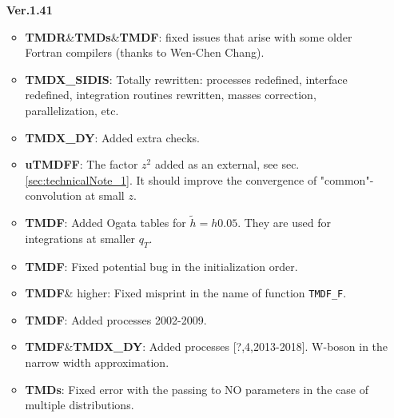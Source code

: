 \documentclass[prd,nofootinbib,eqsecnum,final]{revtex4}
\renewcommand{\(}{\left(}
\renewcommand{\)}{\right)}
\renewcommand{\[}{\left[}
\renewcommand{\]}{\right]}
\begin{document}
\begin{itemize}
\vspace{0.4cm}

\hrule

\item[\textbf{Ver.1.41}]
\begin{itemize}
	\item \textbf{TMDR}\&\textbf{TMDs}\&\textbf{TMDF}: fixed issues that arise with some older Fortran compilers (thanks to Wen-Chen Chang).
	\item \textbf{TMDX{\_}SIDIS}: Totally rewritten: processes redefined, interface redefined, integration routines rewritten, masses correction, parallelization, etc.
	\item \textbf{TMDX{\_}DY}: Added extra checks.
	\item \textbf{uTMDFF}: The factor $z^2$ added as an external, see sec.\ref{sec:technicalNote_1}. It should improve the convergence of "common"-convolution at small $z$.
	\item \textbf{TMDF}: Added Ogata tables for $\tilde h=h 0.05$. They are used for integrations at smaller $q_T$.
	\item \textbf{TMDF}: Fixed potential bug in the initialization order.
    \item \textbf{TMDF}\& higher: Fixed misprint in the name of function \texttt{TMDF\_F}.
	\item \textbf{TMDF}: Added processes 2002-2009.
	\item \textbf{TMDF}\&\textbf{TMDX\_DY}: Added processes [?,4,2013-2018]. W-boson in the narrow width approximation.
	\item \textbf{TMDs}: Fixed error with the passing to NO parameters in the case of multiple distributions.
\end{itemize}


\end{itemize}
\end{document}
